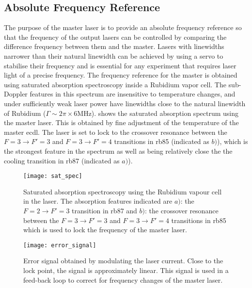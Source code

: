 \subsection{Absolute Frequency Reference} \label{subsec:muquans_master}
The purpose of the master laser is to provide an absolute frequency reference so that the frequency of the output lasers can be controlled by comparing the difference frequency between them and the master. Lasers with linewidths narrower than their natural linewidth can be achieved by using a servo to stabilise their frequency and is essential for any experiment that requires laser light of a precise frequency. The frequency reference for the master is obtained using saturated absorption spectroscopy inside a Rubidium vapor cell. The sub-Doppler features in this spectrum are insensitive to temperature changes, and under sufficiently weak laser power have linewidths close to the natural linewidth of Rubidium (\(\Gamma \sim 2\pi \times 6\)MHz).  shows the saturated absorption spectrum using the \Muquans master laser. This is obtained by fine adjustment of the temperature of the master \ac{ecdl}. The laser is set to lock to the crossover resonance between the \(F = 3 \rightarrow F' = 3\) and \(F = 3 \rightarrow F' =4 \) transitions in \ac{rb85} (indicated as \(b)\)), which is the strongest feature in the spectrum as well as being relatively close the the cooling transition in \ac{rb87} (indicated as \(a)\)).   
\begin{figure}[!htbp]
    \texttt{[image: sat\_spec]}
    \caption[Saturated absorption spectroscopy of the \Muquans master laser.]{Saturated absorption spectroscopy using the Rubidium vapour cell in the \Muquans laser. The absorption features indicated are \(a)\): the \(F = 2 \rightarrow F' = 3\) transition in \ac{rb87} and \(b)\): the crossover resonance between the \(F = 3 \rightarrow F' = 3\) and \(F = 3 \rightarrow F' =4 \) transitions in \ac{rb85} which is used to lock the frequency of the master laser.}
    \label{fig:muquans_satspec}
\end{figure}
\begin{figure}[!htbp]
    \texttt{[image: error\_signal]}
    \caption[Error Signal for the \Muquans master servo.]{Error signal obtained by modulating the laser current. Close to the lock point, the signal is approximately linear. This signal is used in a feed-back loop to correct for frequency changes of the master laser.}
    \label{fig:muquans:error_signal}
\end{figure}
